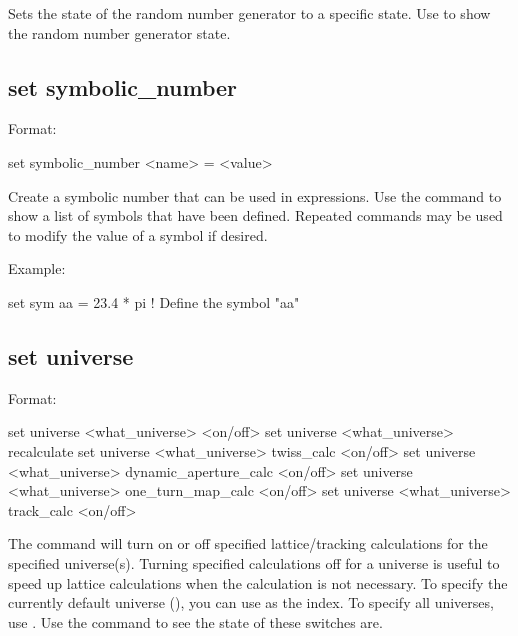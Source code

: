 {{Sets the state of the random number generator to a specific state. Use  to show the random number generator state.


\subsection{set symbolic_number}
\label{s:set.symbolic}

Format:
\begin{example}
  set symbolic_number <name> = <value>
\end{example}

Create a symbolic number that can be used in expressions. Use the  command
to show a list of symbols that have been defined. Repeated  commands may be used to modify
the value of a symbol if desired.

Example:
\begin{example}
  set sym aa = 23.4 * pi  ! Define the symbol "aa"
\end{example}


\subsection{set universe}
\label{s:set.universe}

Format:
\begin{example}
  set universe <what_universe> <on/off>
  set universe <what_universe> recalculate
  set universe <what_universe> twiss_calc <on/off>
  set universe <what_universe> dynamic_aperture_calc <on/off>
  set universe <what_universe> one_turn_map_calc <on/off>
  set universe <what_universe> track_calc <on/off>
\end{example}

The  command will turn on or off specified lattice/tracking
calculations for the specified universe(s). Turning specified calculations off for a universe is
useful to speed up lattice calculations when the calculation is not necessary. To specify the
currently default universe (), you can use  as the 
index. To specify all universes, use \vn{*}. Use the  command to see the state of
these switches are.

}}
